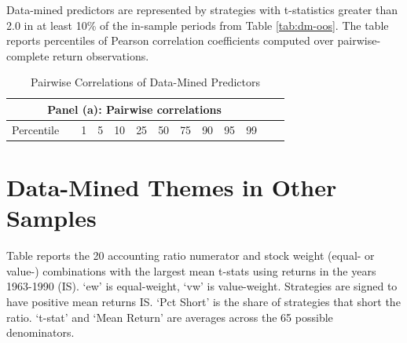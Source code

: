 \begin{table}[!h]
\begin{center}
\begin{tabular}{crrrrrrrrrrrr}
  
  
  \bottomrule \end{tabular}%
  \end{center} 
\end{table}


\begin{table}[!h]
  \caption{Pairwise Correlations of Data-Mined Predictors}
  \label{tab:dm-cor}
  
  \begin{singlespace}
  \noindent Data-mined predictors are represented by strategies with t-statistics greater than 2.0 in at least 10\% of the in-sample periods from Table \ref{tab:dm-oos}.  The table reports percentiles of Pearson correlation coefficients computed over pairwise-complete return observations. 
  \end{singlespace}
  \begin{centering}
  \vspace{-2ex}
  \par\end{centering}
  \centering{}\setlength{\tabcolsep}{1.7ex} \small
  \begin{center}
  \begin{tabular}{clccccccccccc}
  \toprule
   \multicolumn{11}{c}{Panel (a): Pairwise correlations} \\
  \midrule
  Percentile & & 1 & 5 & 10 & 25 & 50 & 75 & 90 & 95 & 99 \\
  \midrule
  
  \bottomrule
  \end{tabular}
  \end{center}
\end{table}

\clearpage
\newpage
\section{Data-Mined Themes in Other Samples}\label{sec:ia-themes}

\begin{table}[!h]
\caption{Themes from Mining Accounting Ratios in 1990}\label{tab:dm-theme1990}
\small

Table reports the 20 accounting ratio numerator and stock weight (equal- or value-) combinations with the largest mean t-stats using returns in the years 1963-1990 (IS). `ew' is equal-weight, `vw' is value-weight. Strategies are signed to have positive mean returns IS. `Pct Short' is the share of strategies that short the ratio.  `t-stat' and  `Mean Return' are averages across the 65 possible denominators. 
\vspace{2ex}

\centering

\setlength{\tabcolsep}{1.0ex}


\end{table}


